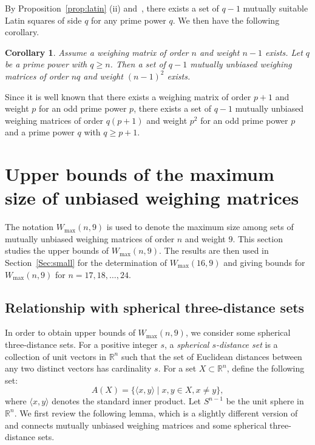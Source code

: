 \documentclass[12pt]{article}
\newtheorem{cor}[thm]{Corollary}
\theoremstyle{remark}
\newcommand{\RR}{\mathbb{R}}
\begin{document}
By Proposition~\ref{prop:latin} (ii) and~\cite[Lemma~2.3]{HKO},
there exists a set of $q-1$ mutually suitable Latin squares of side $q$ for any prime power $q$.
We then have the following corollary. 
\begin{cor}\label{cor::muwm}
Assume a weighing matrix of order $n$ and weight $n-1$ exists.
Let $q$ be a prime power with $q\geq n$. 
Then a set of $q-1$ mutually unbiased weighing matrices of order $nq$ and weight $(n-1)^2$ exists. 
\end{cor}

Since it is well known that there exists a weighing matrix of order $p+1$ and weight $p$ 
for an odd prime power $p$,
there exists a set of $q-1$ mutually unbiased weighing matrices of order $q(p+1)$ and 
weight $p^2$ for 
an odd prime power $p$ and a prime power $q$ with $q\geq p+1$.


\section{Upper bounds of the maximum size of unbiased weighing matrices}
\label{Sec:sdp}

The notation $W_{\max}(n,9)$ is used to denote
the maximum size  among sets of mutually
unbiased weighing matrices of order $n$ and weight $9$.
This section studies the upper bounds of $W_{\max}(n,9)$.
The results are then used in Section~\ref{Sec:small} 
for the determination of $W_{\max}(16,9)$ and 
giving bounds for $W_{\max}(n,9)$ for $n=17,18,\ldots,24$.


\subsection{Relationship with spherical three-distance sets}

In order to obtain upper bounds of $W_{\max}(n,9)$, we consider
some spherical three-distance sets.
For a positive integer $s$, a \emph{spherical $s$-distance set} is a collection of unit vectors 
in $\mathbb{R}^{n}$ such that
the set of Euclidean distances between any two distinct vectors has cardinality $s$. 
For a set $X\subset  \RR^{n}$,
define the following set:
\begin{equation}\label{eq:ax}
A(X)=\{\langle x,y\rangle \mid x,y\in X,x\neq y \}, 
\end{equation}
where $\langle x,y\rangle $ denotes
the standard inner product.
Let $S^{n-1}$ be the unit sphere in $\RR^n$. 
We first review the following lemma, which is a slightly different version 
of {\cite[Proposition~2.3]{NS}} 
and connects mutually unbiased weighing matrices and some spherical three-distance sets.
\end{document}
